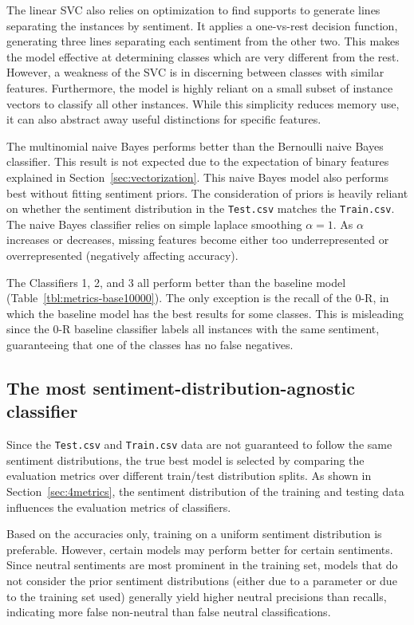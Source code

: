 \documentclass[11pt]{article}
\begin{document}
The linear SVC also relies on optimization to find supports to generate lines separating the instances by sentiment.
It applies a one-vs-rest decision function, generating three lines separating each sentiment from the other two.
This makes the model effective at determining classes which are very different from the rest.
However, a weakness of the SVC is in discerning between classes with similar features. 
Furthermore, the model is highly reliant on a small subset of instance vectors to classify all other instances. 
While this simplicity reduces memory use, it can also abstract away useful distinctions for specific features.


The multinomial naive Bayes performs better than the Bernoulli naive Bayes classifier.
This result is not expected due to the expectation of binary features explained in Section~\ref{sec:vectorization}.
This naive Bayes model also performs best without fitting sentiment priors.
The consideration of priors is heavily reliant on whether the sentiment distribution in the \texttt{Test.csv} matches the \texttt{Train.csv}.
The naive Bayes classifier relies on simple laplace smoothing $\alpha = 1$. 
As $\alpha$ increases or decreases,
missing features become either too underrepresented or overrepresented (negatively affecting accuracy).

The Classifiers 1, 2, and 3 all perform better than the baseline model (Table~\ref{tbl:metrics-base10000}). 
The only exception is the recall of the 0-R, in which the baseline model has the best results for some classes.
This is misleading since the 0-R baseline classifier labels all instances with the same sentiment, 
guaranteeing that one of the classes has no false negatives.


\subsection{The most sentiment-distribution-agnostic classifier}\label{sec:agnostic}

Since the \texttt{Test.csv} and \texttt{Train.csv} data are not guaranteed to follow the same sentiment distributions,
the true best model is selected by comparing the evaluation metrics over different train/test distribution splits.
As shown in Section~\ref{sec:4metrics}, the sentiment distribution of the training and testing data influences the evaluation metrics of classifiers.

Based on the accuracies only, training on a uniform sentiment distribution is preferable.
However, certain models may perform better for certain sentiments.
Since neutral sentiments are most prominent in the training set, models that do not consider the prior sentiment distributions 
(either due to a parameter or due to the training set used) generally yield higher neutral precisions than recalls,
indicating more false non-neutral than false neutral classifications.
\end{document}
